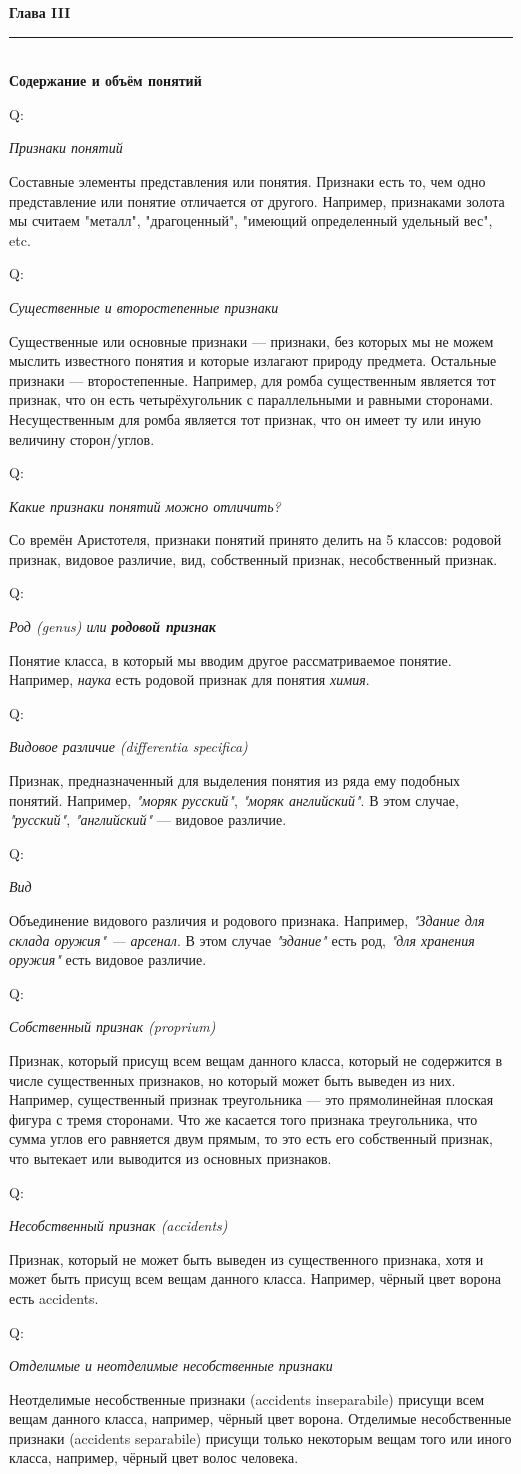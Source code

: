 \documentclass{article}
\newcommand{\note}[1]{\textit{#1}}
\newcommand{\important}[1]{\textbf{#1}}
\renewcommand{\section}[2]{
	\vspace{6em}
	\begin{flushright}
		\Large
		\baselineskip=0.5\baselineskip
		\textbf{#1}
		\\
		\rule[0.5\baselineskip]{\textwidth}{0.15pt}
		\\
		\textbf{#2}
	\end{flushright}
}
\newcommand{\question}[2]{
	\begin{flushright}
		Q:\hspace{2ex}\vline\hspace{2ex}
		\begin{minipage}{0.9\textwidth}
			\large
			\textit{#1}
		\end{minipage}
	\end{flushright}
	\begin{center}
		\begin{minipage}{0.95\textwidth}
			#2
		\end{minipage}
	\end{center}
}
\begin{document}
\section{Глава III}{Содержание и объём понятий}
\question{Признаки понятий}{Составные элементы представления или понятия. Признаки есть то, чем одно представление или понятие отличается от другого. Например, признаками золота мы считаем "металл", "драгоценный", "имеющий определенный удельный вес", etc.}
\question{Существенные и второстепенные признаки}{Существенные или основные признаки --- признаки, без которых мы не можем мыслить известного понятия и которые излагают природу предмета. Остальные признаки --- второстепенные. Например, для ромба существенным является тот признак, что он есть четырёхугольник с параллельными и равными сторонами. Несущественным для ромба является тот признак, что он имеет ту или иную величину сторон/углов.}
\question{Какие признаки понятий можно отличить?}{Со времён Аристотеля, признаки понятий принято делить на 5 классов: родовой признак, видовое различие, вид, собственный признак, несобственный признак.}
\question{Род (genus) или \important{родовой признак}}{Понятие класса, в который мы вводим другое рассматриваемое понятие. Например, \note{наука} есть родовой признак для понятия \note{химия}.}
\question{Видовое различие (differentia specifica)}{Признак, предназначенный для выделения понятия из ряда ему подобных понятий. Например, \note{"моряк русский"}, \note{"моряк английский"}. В этом случае, \note{"русский"}, \note{"английский"} --- видовое различие.}
\question{Вид}{Объединение видового различия и родового признака. Например, \note{"Здание для склада оружия" --- арсенал}. В этом случае \note{"здание"} есть род, \note{"для хранения оружия"} есть видовое различие.}
\question{Собственный признак (proprium)}{Признак, который присущ всем вещам данного класса, который не содержится в числе существенных признаков, но который может быть выведен из них. Например, существенный признак треугольника --- это прямолинейная плоская фигура с тремя сторонами. Что же касается того признака треугольника, что сумма углов его равняется двум прямым, то это есть его собственный признак, что вытекает или выводится из основных признаков.}
\question{Несобственный признак (accidents)}{Признак, который не может быть выведен из существенного признака, хотя и может быть присущ всем вещам данного класса. Например, чёрный цвет ворона есть accidents.}
\question{Отделимые и неотделимые несобственные признаки}{Неотделимые несобственные признаки (accidents inseparabile) присущи всем вещам данного класса, например, чёрный цвет ворона. Отделимые несобственные признаки (accidents separabile) присущи только некоторым вещам того или иного класса, например, чёрный цвет волос человека.}
\end{document}
